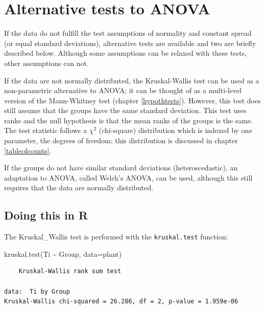 \documentclass[
  oneside]{krantz}
\newenvironment{Shaded}{\begin{snugshade}}{\end{snugshade}}
\newcommand{\AttributeTok}[1]{\textcolor[rgb]{0.77,0.63,0.00}{#1}}
\newcommand{\FunctionTok}[1]{\textcolor[rgb]{0.00,0.00,0.00}{#1}}
\newcommand{\NormalTok}[1]{#1}
\newcommand{\SpecialCharTok}[1]{\textcolor[rgb]{0.00,0.00,0.00}{#1}}
\begin{document}
\hypertarget{alternative-tests-to-anova}{%
\section{Alternative tests to ANOVA}\label{alternative-tests-to-anova}}

If the data do not fulfill the test assumptions of normality and constant spread (or equal standard deviations), alternative tests are available and two are briefly described below. Although some assumptions can be relaxed with these tests, other assumptions can not.

If the data are not normally distributed, the Kruskal-Wallis test can be used as a non-parametric alternative to ANOVA; it can be thought of as a multi-level version of the Mann-Whitney test (chapter \ref{hypothtests}). However, this test does still assume that the groups have the same standard deviation. This test uses ranks and the null hypothesis is that the mean ranks of the groups is the same. The test statistic follows a \(\chi^2\) (chi-square) distribution which is indexed by one parameter, the degrees of freedom; this distribution is discussed in chapter \ref{tableofcounts}.

If the groups do not have similar standard deviations (heteroscedastic), an adaptation to ANOVA, called Welch's ANOVA, can be used, although this still requires that the data are normally distributed.

\hypertarget{doing-this-in-r-18}{%
\subsection{Doing this in R}\label{doing-this-in-r-18}}

The Kruskal\_Wallis test is performed with the \texttt{kruskal.test} function:

\begin{Shaded}
\begin{Highlighting}[]
\FunctionTok{kruskal.test}\NormalTok{(Ti }\SpecialCharTok{\textasciitilde{}}\NormalTok{ Group, }\AttributeTok{data=}\NormalTok{plant)}
\end{Highlighting}
\end{Shaded}

\begin{verbatim}
    Kruskal-Wallis rank sum test

data:  Ti by Group
Kruskal-Wallis chi-squared = 26.286, df = 2, p-value = 1.959e-06
\end{verbatim}
\end{document}
